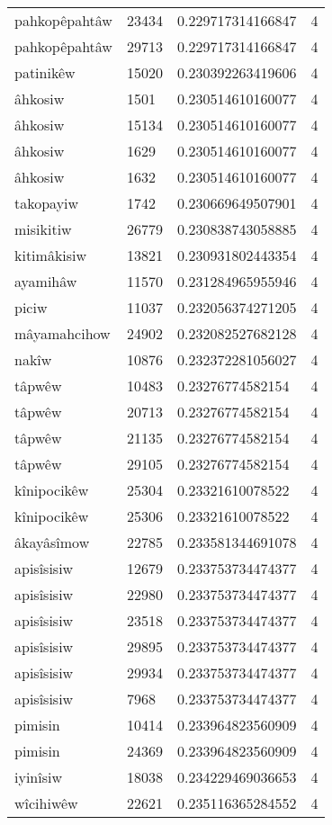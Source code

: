 \begin{longtable}{llll}
pahkopêpahtâw & 23434 & 0.229717314166847 & 4 \\
pahkopêpahtâw & 29713 & 0.229717314166847 & 4 \\
patinikêw & 15020 & 0.230392263419606 & 4 \\
âhkosiw & 1501 & 0.230514610160077 & 4 \\
âhkosiw & 15134 & 0.230514610160077 & 4 \\
âhkosiw & 1629 & 0.230514610160077 & 4 \\
âhkosiw & 1632 & 0.230514610160077 & 4 \\
takopayiw & 1742 & 0.230669649507901 & 4 \\
misikitiw & 26779 & 0.230838743058885 & 4 \\
kitimâkisiw & 13821 & 0.230931802443354 & 4 \\
ayamihâw & 11570 & 0.231284965955946 & 4 \\
piciw & 11037 & 0.232056374271205 & 4 \\
mâyamahcihow & 24902 & 0.232082527682128 & 4 \\
nakîw & 10876 & 0.232372281056027 & 4 \\
tâpwêw & 10483 & 0.23276774582154 & 4 \\
tâpwêw & 20713 & 0.23276774582154 & 4 \\
tâpwêw & 21135 & 0.23276774582154 & 4 \\
tâpwêw & 29105 & 0.23276774582154 & 4 \\
kînipocikêw & 25304 & 0.23321610078522 & 4 \\
kînipocikêw & 25306 & 0.23321610078522 & 4 \\
âkayâsîmow & 22785 & 0.233581344691078 & 4 \\
apisîsisiw & 12679 & 0.233753734474377 & 4 \\
apisîsisiw & 22980 & 0.233753734474377 & 4 \\
apisîsisiw & 23518 & 0.233753734474377 & 4 \\
apisîsisiw & 29895 & 0.233753734474377 & 4 \\
apisîsisiw & 29934 & 0.233753734474377 & 4 \\
apisîsisiw & 7968 & 0.233753734474377 & 4 \\
pimisin & 10414 & 0.233964823560909 & 4 \\
pimisin & 24369 & 0.233964823560909 & 4 \\
iyinîsiw & 18038 & 0.234229469036653 & 4 \\
wîcihiwêw & 22621 & 0.235116365284552 & 4 \\

\end{longtable}
